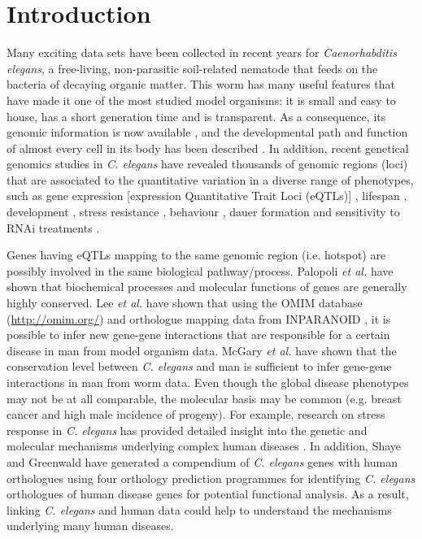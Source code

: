 \section{Introduction}
Many exciting data sets have been collected in recent years for \textsl{Cae\-nor\-hab\-di\-tis elegans}, a free-living, non-parasitic soil-related nematode that feeds on the bacteria of decaying organic matter.
This worm has many useful features that have made it one of the most studied model organisms: it is small and easy to house, has a short generation time and is transparent.
As a consequence, its genomic information is now available \cite{The_C_nbsp_elegans_Sequencing_Consortium_1998}, and the developmental path and function of almost every cell in its body has been described \cite{Gerstein_2010}.
In addition, recent genetical genomics studies in \textsl{C. elegans} have revealed thousands of genomic regions (loci) that are associated to the quantitative variation in a diverse range of phenotypes, such as gene expression [expression Quantitative Trait Loci (eQTLs)] \cite{Gaertner_2010,Kammenga_2008,Palopoli_2008,Li_2010,Vinuela_2010,Vinuela_2012,Rockman_2010}, lifespan \cite{Doroszuk_2009}, development \cite{Gutteling_2007,Gutteling_2006,Kammenga_2007}, stress resistance \cite{Rodriguez_2012,Harvey_2008}, behaviour \cite{McGrath_2009,Reddy_2009}, dauer formation \cite{Harvey_2008,Green_2013a} and sensitivity to RNAi treatments \cite{Elvin_2011}.

Genes having eQTLs mapping to the same genomic region (i.e. hotspot) are possibly involved in the same biological pathway/process. Palopoli \textsl{et al.} \cite{Palopoli_2008} have shown that biochemical processes and molecular functions of genes are generally highly conserved.
Lee \textsl{et al.} \cite{Lee_2008} have shown that using the OMIM database \cite{Hamosh_2000} (\url{http://omim.org/}) and orthologue mapping data from INPARANOID \cite{Ostlund_2009}, it is possible to infer new gene-gene interactions that are responsible for a certain disease in man from model organism data.
McGary \textsl{et al.} \cite{McGary_2010} have shown that the conservation level between \textsl{C. elegans} and man is sufficient to infer gene-gene interactions in man from worm data.
Even though the global disease phenotypes may not be at all comparable, the molecular basis may be common (e.g. breast cancer and high male incidence of progeny).
For example, research on stress response in \textsl{C. elegans} has provided detailed insight into the genetic and molecular mechanisms underlying complex human diseases \cite{Rodriguez_2013}.
In addition, Shaye and Greenwald \cite{Shaye_2011} have generated a compendium of \textsl{C. elegans} genes with human orthologues using four orthology prediction programmes for identifying \textsl{C. elegans} orthologues of human disease genes for potential functional analysis.
As a result, linking \textsl{C. elegans} and human data could help to understand the mechanisms underlying many human diseases.

